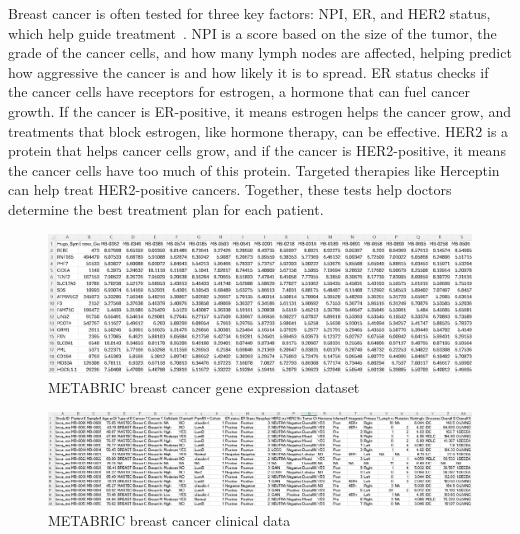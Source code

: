 \documentclass{statsoc}
\begin{document}
Breast cancer is often tested for three key factors: NPI, ER, and HER2 status, which help guide treatment~\citep{haybittle1982prognostic, jensen1973estrogen, di1987erb}. NPI is a score based on the size of the tumor, the grade of the cancer cells, and how many lymph nodes are affected, helping predict how aggressive the cancer is and how likely it is to spread. ER status checks if the cancer cells have receptors for estrogen, a hormone that can fuel cancer growth. If the cancer is ER-positive, it means estrogen helps the cancer grow, and treatments that block estrogen, like hormone therapy, can be effective. HER2 is a protein that helps cancer cells grow, and if the cancer is HER2-positive, it means the cancer cells have too much of this protein. Targeted therapies like Herceptin can help treat HER2-positive cancers. Together, these tests help doctors determine the best treatment plan for each patient.

\begin{figure}[h!]
    \centering
    \includegraphics[width=\textwidth]{metabric_expr.png}
    \caption{METABRIC breast cancer gene expression dataset}
    \label{fig:metabric_expr}
\end{figure}

\begin{figure}[h!]
    \centering
    \includegraphics[width=\textwidth]{metabric_data.png}
    \caption{METABRIC breast cancer clinical data}
    \label{fig:metabric_data}
\end{figure}
\end{document}
